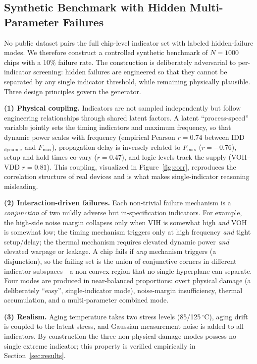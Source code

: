 \documentclass[electronics,article,submit,pdftex,moreauthors]{Definitions/mdpi}
\begin{document}
\subsection{Synthetic Benchmark with Hidden Multi-Parameter Failures}\label{sec:data}
No public dataset pairs the full chip-level indicator set with labeled hidden-failure modes. We therefore construct a controlled synthetic benchmark of $N{=}1000$ chips with a 10\% failure rate. The construction is deliberately adversarial to per-indicator screening: hidden failures are engineered so that they cannot be separated by any single indicator threshold, while remaining physically plausible. Three design principles govern the generator.

\textbf{(1) Physical coupling.} Indicators are not sampled independently but follow engineering relationships through shared latent factors. A latent ``process-speed'' variable jointly sets the timing indicators and maximum frequency, so that dynamic power scales with frequency (empirical Pearson $r{=}0.74$ between IDD$_{\text{dynamic}}$ and $F_{\max}$), propagation delay is inversely related to $F_{\max}$ ($r{=}-0.76$), setup and hold times co-vary ($r{=}0.47$), and logic levels track the supply (VOH--VDD $r{=}0.81$). This coupling, visualized in Figure~\ref{fig:corr}, reproduces the correlation structure of real devices and is what makes single-indicator reasoning misleading.

\textbf{(2) Interaction-driven failures.} Each non-trivial failure mechanism is a \emph{conjunction} of two mildly adverse but in-specification indicators. For example, the high-side noise margin collapses only when VIH is somewhat high \emph{and} VOH is somewhat low; the timing mechanism triggers only at high frequency \emph{and} tight setup/delay; the thermal mechanism requires elevated dynamic power \emph{and} elevated warpage or leakage. A chip fails if \emph{any} mechanism triggers (a disjunction), so the failing set is the union of conjunctive corners in different indicator subspaces---a non-convex region that no single hyperplane can separate. Four modes are produced in near-balanced proportions: overt physical damage (a deliberately ``easy'', single-indicator mode), noise-margin insufficiency, thermal accumulation, and a multi-parameter combined mode.

\textbf{(3) Realism.} Aging temperature takes two stress levels (85/125\,$^\circ$C), aging drift is coupled to the latent stress, and Gaussian measurement noise is added to all indicators. By construction the three non-physical-damage modes possess no single extreme indicator; this property is verified empirically in Section~\ref{sec:results}.
\end{document}

